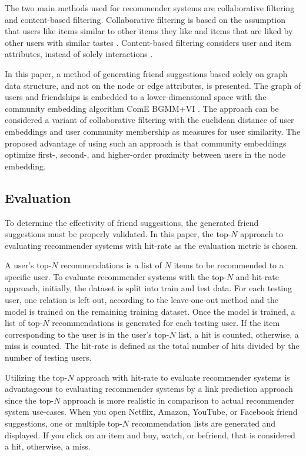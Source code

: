 \documentclass[conference]{IEEEtran}
\begin{document}
The two main methods used for recommender systems are collaborative filtering and content-based filtering. Collaborative filtering is based on the assumption that users like items similar to other items they like and items that are liked by other users with similar tastes \cite{Grover17, Su2009ASO}. Content-based filtering considers user and item attributes, instead of solely interactions \cite{Rocca19, Lops2011SurveyCB}.

In this paper, a method of generating friend suggestions based solely on graph data structure, and not on the node or edge attributes, is presented. The graph of users and friendships is embedded to a lower-dimensional space with the community embedding algorithm ComE BGMM+VI \cite{ComE, ComE+, ComE_BGMM_GH}. The approach can be considered a variant of collaborative filtering with the euclidean distance of user embeddings and user community membership as measures for user similarity. The proposed advantage of using such an approach is that community embeddings optimize first-, second-, and higher-order proximity between users in the node embedding.

\subsection{Evaluation}

To determine the effectivity of friend suggestions, the generated friend suggestions must be properly validated. In this paper, the top-$N$ approach to evaluating recommender systems with hit-rate as the evaluation metric is chosen.

A user's top-$N$ recommendations is a list of $N$ items to be recommended to a specific user. To evaluate recommender systems with the top-$N$ and hit-rate approach, initially, the dataset is split into train and test data. For each testing user, one relation is left out, according to the leave-one-out method and the model is trained on the remaining training dataset. Once the model is trained, a list of top-$N$ recommendations is generated for each testing user. If the item corresponding to the user is in the user's top-$N$ list, a hit is counted, otherwise, a miss is counted. The hit-rate is defined as the total number of hits divided by the number of testing users.

Utilizing the top-$N$ approach with hit-rate to evaluate recommender systems is advantageous to evaluating recommender systems by a link prediction approach since the top-$N$ approach is more realistic in comparison to actual recommender system use-cases. When you open Netflix, Amazon, YouTube, or Facebook friend suggestions, one or multiple top-$N$ recommendation lists are generated and displayed. If you click on an item and buy, watch, or befriend, that is considered a hit, otherwise, a miss.
\end{document}
